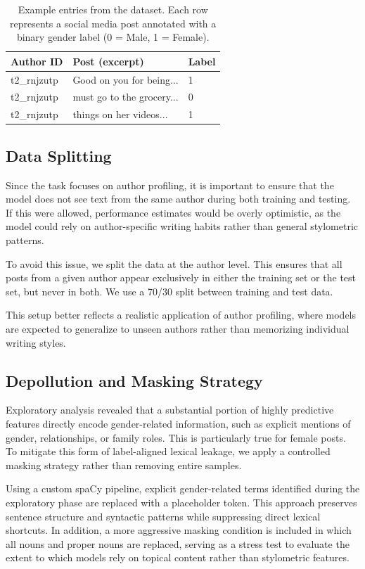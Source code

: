 \documentclass[11pt]{article}
\begin{document}
\begin{table}[ht]
\centering
\label{tab:dataset_examples}
\begin{tabular}{lll}
\hline
\textbf{Author ID} & \textbf{Post (excerpt)} & \textbf{Label} \\
\hline
t2\_rnjzutp & Good on you for being... & 1 \\
t2\_rnjzutp & must go to the grocery... & 0 \\
t2\_rnjzutp & things on her videos... & 1 \\
\hline
\end{tabular}
\caption{Example entries from the dataset. Each row represents a social media post annotated with a binary gender label (0 = Male, 1 = Female).}
\end{table}

\subsection{Data Splitting}
Since the task focuses on author profiling, it is important to ensure that the
model does not see text from the same author during both training and testing.
If this were allowed, performance estimates would be overly optimistic, as the
model could rely on author-specific writing habits rather than general
stylometric patterns.

To avoid this issue, we split the data at the author level. This
ensures that all posts from a given author appear exclusively in either the
training set or the test set, but never in both. We use a 70/30 split between
training and test data.

This setup better reflects a realistic application of author profiling, where
models are expected to generalize to unseen authors rather than memorizing
individual writing styles.

\subsection{Depollution and Masking Strategy}
Exploratory analysis revealed that a substantial portion of highly predictive
features directly encode gender-related information, such as explicit mentions
of gender, relationships, or family roles. This is particularly true for female posts. To mitigate this form of label-aligned lexical leakage, we apply a controlled masking strategy rather than removing entire samples.

Using a custom spaCy pipeline, explicit gender-related terms identified during
the exploratory phase are replaced with a placeholder token. This approach
preserves sentence structure and syntactic patterns while suppressing direct
lexical shortcuts. In addition, a more aggressive masking condition is included
in which all nouns and proper nouns are replaced, serving as a stress test to
evaluate the extent to which models rely on topical content rather than
stylometric features.
\end{document}
